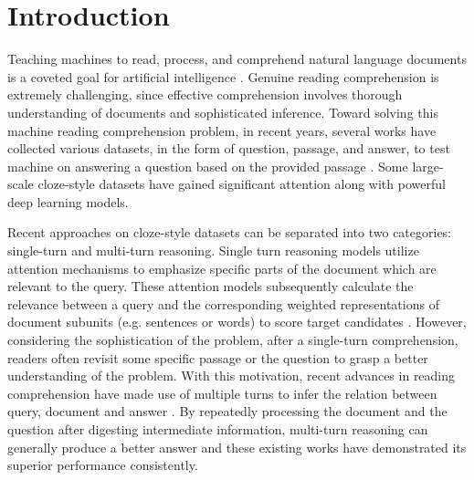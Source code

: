 \documentclass[sigconf]{acmart}
\begin{document}


\maketitle


\section{Introduction}
Teaching machines to read, process, and comprehend natural language documents is a coveted goal for artificial intelligence \citep{bottou2014machine, richardson2013mctest, HermannNIPS2015}. Genuine reading comprehension is extremely challenging, since effective comprehension involves thorough understanding of documents and sophisticated inference. 
Toward solving this machine reading comprehension problem, in recent years, several works have collected various datasets, in the form of question, passage, and answer, to test machine on answering a question based on the provided passage \citep{richardson2013mctest, HermannNIPS2015, HillICLR2016, Squad2016}. Some large-scale cloze-style datasets \citep{HermannNIPS2015, HillICLR2016} have gained significant attention along with powerful deep learning models. 

Recent approaches on cloze-style datasets can be separated into two categories: single-turn and multi-turn reasoning. Single turn reasoning models utilize attention mechanisms \citep{bahdanau2015attention} to emphasize specific parts of the document which are relevant to the query. These attention models subsequently calculate the relevance between a query and the corresponding weighted representations of document subunits (e.g. sentences or words) to score target candidates \citep{HillICLR2016, HermannNIPS2015, KadlecAttentionSum2016}. However, considering the sophistication of the problem, after a single-turn comprehension, readers often revisit some specific passage or the question to grasp a better understanding of the problem. With this motivation, recent advances in reading comprehension have made use of multiple turns to infer the relation between query, document and answer \citep{HillICLR2016, Dhingra2016Gated, Trischler2016EpiReader, Sordoni2016IterativeAtt}. By repeatedly processing the document and the question after digesting intermediate information, multi-turn reasoning can generally produce a better answer and these existing works have demonstrated its superior performance consistently.
\end{document}
